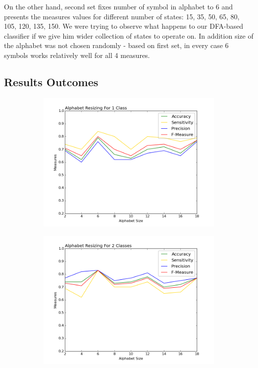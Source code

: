 \documentclass{mini}
\begin{document}
On the other hand, second set fixes number of symbol in alphabet to 6 and presents the measures values for different number of states: 15, 35, 50, 65, 80, 105, 120, 135, 150. We were trying to observe what happens to our DFA-based classifier if we give him wider collection of states to operate on. In addition size of the alphabet was not chosen randomly - based on first set, in every case 6 symbols works relatively well for all 4 measures.

\subsection{Results Outcomes}


\begin{figure}
\begin{subfigure}{.5\textwidth}
  \centering
  \includegraphics[width=1\linewidth]{images/a_c1_fig.png}
  \label{fig:sfig1}
\end{subfigure}%
\begin{subfigure}{.5\textwidth}
  \centering
  \includegraphics[width=1\linewidth]{images/a_c2_fig.png}

\end{subfigure}
\end{figure}
\end{document}

